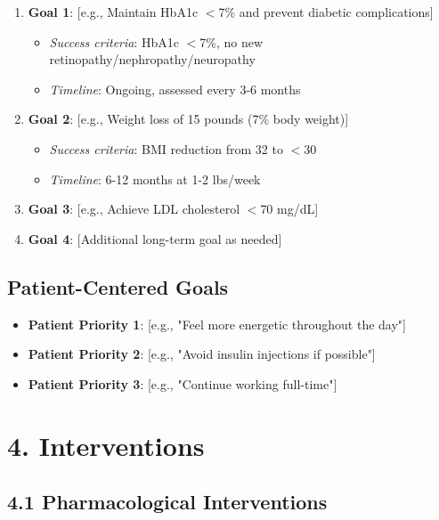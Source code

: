 \documentclass[11pt,letterpaper]{article}
\begin{document}
\begin{enumerate}[leftmargin=*]
    \item \textbf{Goal 1}: [e.g., Maintain HbA1c $<$7\% and prevent diabetic complications]
    \begin{itemize}
        \item \textit{Success criteria}: HbA1c $<$7\%, no new retinopathy/nephropathy/neuropathy
        \item \textit{Timeline}: Ongoing, assessed every 3-6 months
    \end{itemize}
    
    \item \textbf{Goal 2}: [e.g., Weight loss of 15 pounds (7\% body weight)]
    \begin{itemize}
        \item \textit{Success criteria}: BMI reduction from 32 to $<$30
        \item \textit{Timeline}: 6-12 months at 1-2 lbs/week
    \end{itemize}
    
    \item \textbf{Goal 3}: [e.g., Achieve LDL cholesterol $<$70 mg/dL]
    
    \item \textbf{Goal 4}: [Additional long-term goal as needed]
\end{enumerate}

\subsection*{Patient-Centered Goals}
\begin{itemize}[leftmargin=*]
    \item \textbf{Patient Priority 1}: [e.g., "Feel more energetic throughout the day"]
    \item \textbf{Patient Priority 2}: [e.g., "Avoid insulin injections if possible"]
    \item \textbf{Patient Priority 3}: [e.g., "Continue working full-time"]
\end{itemize}

\section*{4. Interventions}

\subsection*{4.1 Pharmacological Interventions}
\end{document}
